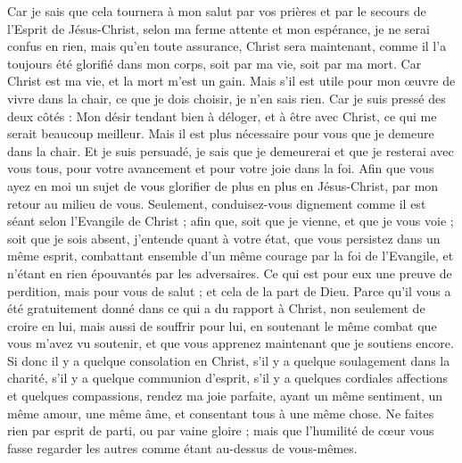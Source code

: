 \begin{multicols}{2}
Car je sais que cela tournera à mon salut par vos prières et par le secours de l'Esprit de Jésus-Christ,
selon ma ferme attente et mon espérance, je ne serai confus en rien, mais qu'en toute assurance, Christ sera maintenant, comme il l'a toujours été glorifié dans mon corps, soit par ma vie, soit par ma mort.
Car Christ est ma vie, et la mort m'est un gain.
Mais s'il est utile pour mon œuvre de vivre dans la chair, ce que je dois choisir, je n'en sais rien.
Car je suis pressé des deux côtés : Mon désir tendant bien à déloger, et à être avec Christ, ce qui me serait beaucoup meilleur. 
Mais il est plus nécessaire pour vous que je demeure dans la chair.
Et je suis persuadé, je sais que je demeurerai et que je resterai avec vous tous, pour votre avancement et pour votre joie dans la foi.
Afin que vous ayez en moi un sujet de vous glorifier de plus en plus en Jésus-Christ, par mon retour au milieu de vous. 
Seulement, conduisez-vous dignement comme il est séant selon l'Evangile de Christ ; afin que, soit que je vienne, et que je vous voie ; soit que je sois absent, j'entende quant à votre état, que vous persistez dans un même esprit, combattant ensemble d'un même courage par la foi de l'Evangile, et n'étant en rien épouvantés par les adversaires.
Ce qui est pour eux une preuve de perdition, mais pour vous de salut ; et cela de la part de Dieu.
Parce qu'il vous a été gratuitement donné dans ce qui a du rapport à Christ, non seulement de croire en lui, mais aussi de souffrir pour lui,
en soutenant le même combat que vous m'avez vu soutenir, et que vous apprenez maintenant que je soutiens encore.
\VerseOne{}Si donc il y a quelque consolation en Christ, s'il y a quelque soulagement dans la charité, s'il y a quelque communion d'esprit, s'il y a quelques cordiales affections et quelques compassions,
rendez ma joie parfaite, ayant un même sentiment, un même amour, une même âme, et consentant tous à une même chose.
Ne faites rien par esprit de parti, ou par vaine gloire ; mais que l'humilité de cœur vous fasse regarder les autres comme étant au-dessus de vous-mêmes.

\end{multicols}
